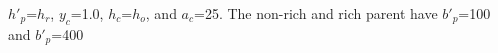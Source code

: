 $h'_p$=$h_r$, $y_c$=1.0, $h_c$=$h_o$, and $a_c$=25. The non-rich and rich parent have $b'_p$=100 and $b'_p$=400